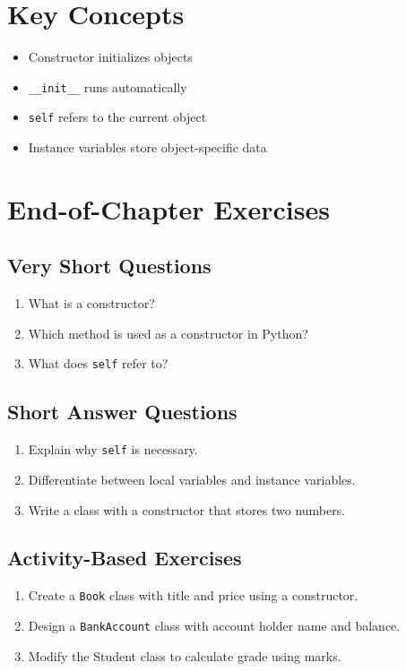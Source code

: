 \section{Key Concepts}

\begin{itemize}
    \item Constructor initializes objects
    \item \texttt{\_\_init\_\_} runs automatically
    \item \texttt{self} refers to the current object
    \item Instance variables store object-specific data
\end{itemize}

\section{End-of-Chapter Exercises}

\subsection{Very Short Questions}

\begin{enumerate}
    \item What is a constructor?
    \item Which method is used as a constructor in Python?
    \item What does \texttt{self} refer to?
\end{enumerate}

\subsection{Short Answer Questions}

\begin{enumerate}
    \item Explain why \texttt{self} is necessary.
    \item Differentiate between local variables and instance variables.
    \item Write a class with a constructor that stores two numbers.
\end{enumerate}

\subsection{Activity-Based Exercises}

\begin{enumerate}
    \item Create a \texttt{Book} class with title and price using a constructor.
    \item Design a \texttt{BankAccount} class with account holder name and balance.
    \item Modify the Student class to calculate grade using marks.
\end{enumerate}

